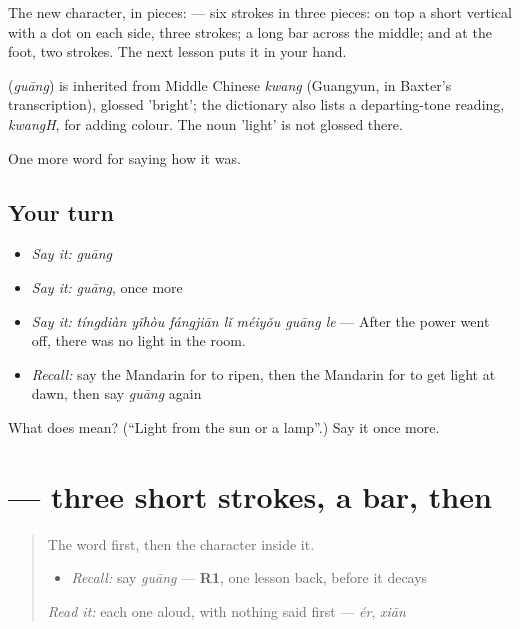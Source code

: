 The new character, in pieces:  — six strokes in three pieces: on top a short vertical with a dot on each side, three strokes; a long bar across the middle; and  at the foot, two strokes. The next lesson puts it in your hand.

\begin{cousinweb}
\textbf{} (\emph{guāng}) is inherited from Middle Chinese \emph{kwang} (Guangyun, in Baxter's transcription), glossed 'bright'; the dictionary also lists a departing-tone reading, \emph{kwangH}, for adding colour. The noun 'light' is not glossed there.
\end{cousinweb}

\begin{grammarlens}[title={What you've built}]
One more word for saying how it was.
\end{grammarlens}

\subsection*{Your turn}
\begin{itemize}
\raggedright
  \item \emph{Say it:} \emph{guāng}
  \item \emph{Say it:} \emph{guāng}, once more
  \item \emph{Say it:} \emph{tíngdiàn yǐhòu fángjiān lǐ méiyǒu guāng le} — After the power went off, there was no light in the room.
  \item \emph{Recall:} say the Mandarin for to ripen, then the Mandarin for to get light at dawn, then say \emph{guāng} again
\end{itemize}

\begin{tcolorbox}[breakable,colback=teal!4,colframe=teal!35!black,title={Before you move on}]
What does  mean? (\textquotedblleft{}Light from the sun or a lamp\textquotedblright{}.) Say it once more.
\end{tcolorbox}
\section[\texorpdfstring{\zh{光} (guāng)}{光 (guāng)}]{ — three short strokes, a bar, then }

\label{lesson:ZH-W517-guang}



\begin{quote}
The word first, then the character inside it.

\begin{itemize}
\raggedright
  \item \emph{Recall:} say \emph{guāng} — \textbf{R1}, one lesson back, before it decays
\end{itemize}

\begin{quote}
 
\end{quote}

\emph{Read it:} each one aloud, with nothing said first — \emph{ér}, \emph{xiān}
\end{quote}

